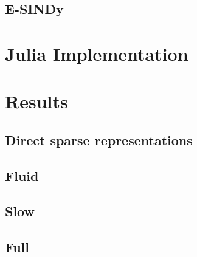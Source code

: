 \documentclass[
]{article}
\begin{document}
\subsection{E-SINDy}\label{e-sindy}

\section{Julia Implementation}\label{julia-implementation}

\section{Results}\label{results}

\subsection{Direct sparse
representations}\label{direct-sparse-representations}

\subsection{Fluid}\label{fluid}

\subsection{Slow}\label{slow}

\subsection{Full}\label{full}


\printbibliography[title=Conclusions]
\end{document}
